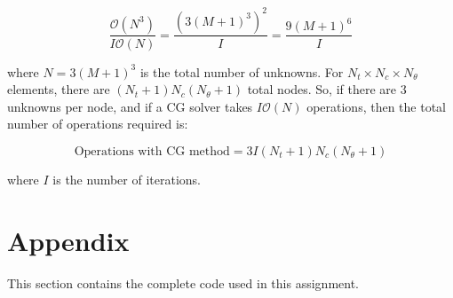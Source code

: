 \documentclass[10pt]{article}
\begin{document}
\begin{equation}
\frac{\mathscr{O}(N^3)}{I\mathscr{O}(N)}=\frac{\left(3(M+1)^3\right)^2}{I}=\frac{9(M+1)^6}{I}
\end{equation}

where \(N=3(M+1)^3\) is the total number of unknowns. For \(N_t\times N_c\times N_\theta\) elements, there are \((N_t+1)N_c(N_\theta+1)\) total nodes. So, if there are 3 unknowns per node, and if a CG solver takes \(I\mathscr{O}(N)\) operations, then the total number of operations required is:

\begin{equation}
\text{Operations with CG method}=3I(N_t+1)N_c(N_\theta+1)
\end{equation}
 
 where \(I\) is the number of iterations.

\section{Appendix}

This section contains the complete code used in this assignment. 
\begin{comment}
\subsection{\texttt{MeshGenerator.m}}
This program generates the mesh and connectivity matrix.

\end{comment}
\end{document}
